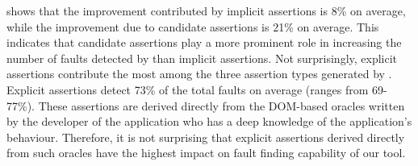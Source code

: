  shows that the improvement contributed by implicit assertions is 8\% on average, while the improvement due to candidate assertions is 21\% on average. This indicates that candidate assertions play a more prominent role in increasing the number of faults detected by \tool than implicit assertions. Not surprisingly, explicit assertions contribute the most among the three assertion types generated by \tool. Explicit assertions detect 73\% of the total faults on average (ranges from 69-77\%). These assertions are derived directly from the DOM-based oracles written by the developer of the application who has a deep knowledge of the application's behaviour. Therefore, it is not surprising that explicit assertions derived directly from such oracles have the highest impact on fault finding capability of our tool.        

